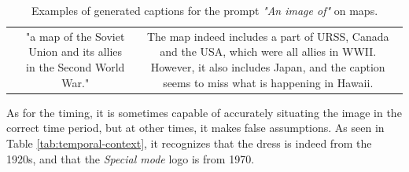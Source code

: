 \begin{table}[h]
\begin{tabular}{c|c|c}
\begin{minipage}[c]{4cm}
        \end{minipage} & 
        \begin{minipage}[c]{0.3\linewidth}
            "a map of the Soviet Union and its allies in the Second World War."
        \end{minipage} &
        \begin{minipage}[c]{0.3\linewidth}
            The map indeed includes a part of URSS, Canada and the USA, which were all allies in WWII. However, it also includes Japan, and the caption seems to miss what is happening in Hawaii.
        \end{minipage} \\
    \end{tabular}
    \caption{Examples of generated captions for the prompt \textit{"An image of"} on maps.}
    \label{tab:distinctiveness}
\end{table}
\clearpage

As for the timing, it is sometimes capable of accurately situating the image in the correct time period, but at other times, it makes false assumptions. As seen in Table \ref{tab:temporal-context}, it recognizes that the dress is indeed from the 1920s, and that the \textit{Special mode} logo is from 1970.

